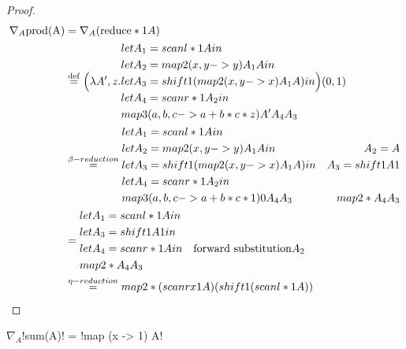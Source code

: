  \begin{proof}
\begin{align*}
    \nabla_A \text{prod(A)} 
    &= \nabla_A(\text{reduce} * 1 A) \\
    &\stackrel {\mathrm{def}}=  \Big(\lambda A',z.
    \begin{aligned}
        & let A_1 = scanl * 1 A in \\
        & let A_2 = map2 (x,y -> y) A_1 A in\\
        & let A_3 = shift1 (map2 (x,y -> x) A_1 A) in\\
        & let A_4 = scanr * 1 A_2 in \\
        & map3 (a,b,c -> a+b*c*z) A' A_4 A_3
    \end{aligned}
    \Big)(0,1)\\
    &\stackrel{\beta-reduction}{=}  \begin{aligned}
        & let A_1 = scanl * 1 A in &\\
        & let A_2 = map2 (x,y -> y) A_1 A in & A_2=  A\\
        & let A_3 = shift1 (map2 (x,y -> x) A_1 A) in & A_3 = shift1 A1\\
        & let A_4 = scanr * 1 A_2 in & \\
        & map3 (a,b,c -> a+b*c*1) 0 A_4 A_3 & map2 * A_4 A_3
    \end{aligned}\\
    &=  \begin{aligned}
        & let A_1 = scanl * 1 A in & \\
        & let A_3 = shift1 A1 in &\\
        & let A_4 = scanr * 1 A in &\text{forward substitution} A_2\\
        & map2 * A_4 A_3
    \end{aligned}\\
    &\stackrel{\eta-reduction}{=} map2 * (scanr x 1 A) (shift1(scanl * 1 A))
\end{align*}
 \end{proof}

 \begin{lemma}
     $\nabla_A$!sum(A)! = !map (x -> 1) A!
 \end{lemma}


